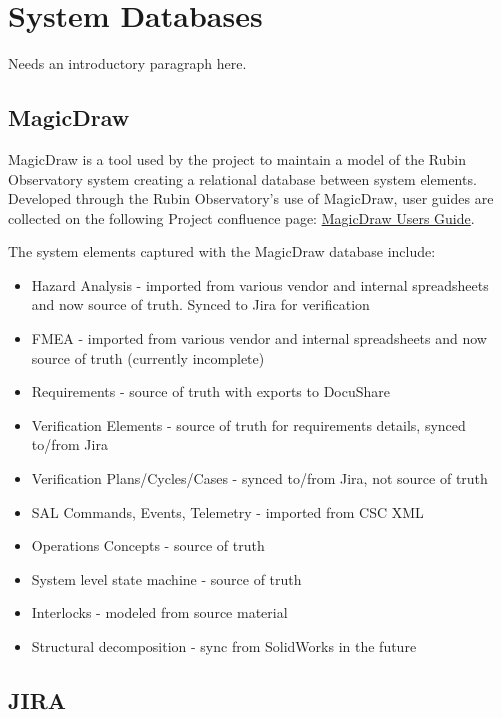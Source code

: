 \newpage
\section{System Databases}

Needs an introductory paragraph here.

\subsection{MagicDraw}

MagicDraw \citep{MagicDraw-cite} is a tool used by the project to maintain a model of the Rubin Observatory system creating a relational database between system elements.  Developed through the Rubin Observatory's use of MagicDraw, user guides are collected on the following Project confluence page: \href{https://confluence.lsstcorp.org/display/SYSENG/MagicDraw+LSST+Users+Guide}{MagicDraw Users Guide}.

The system elements captured with the MagicDraw database include:

\begin{itemize}
	\item Hazard Analysis - imported from various vendor and internal spreadsheets and now source of truth. Synced to Jira for verification
	\item FMEA - imported from various vendor and internal spreadsheets and now source of truth (currently incomplete)
	\item Requirements - source of truth with exports to DocuShare
	\item Verification Elements - source of truth for requirements details, synced to/from Jira
	\item Verification Plans/Cycles/Cases - synced to/from Jira, not source of truth
	\item SAL Commands, Events, Telemetry - imported from CSC XML
	\item Operations Concepts - source of truth
	\item System level state machine - source of truth
	\item Interlocks - modeled from source material
	\item Structural decomposition - sync from SolidWorks in the future
\end{itemize}

\subsection{JIRA}

